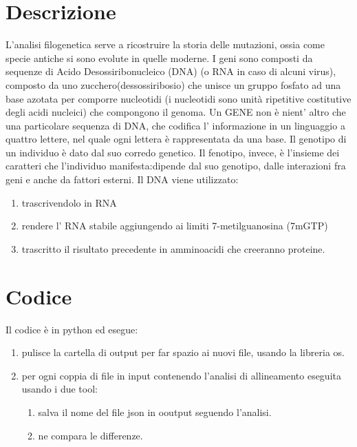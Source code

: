 \documentclass[12pt]{article}
\begin{document}
\section{Descrizione}
	
	L'analisi filogenetica serve a ricostruire la storia delle mutazioni, ossia come specie antiche si sono evolute in quelle moderne.\newline
	I geni sono composti da sequenze di Acido Desossiribonucleico (DNA) (o RNA in caso di alcuni virus), composto da uno zucchero(dessossiribosio) che unisce un gruppo fosfato ad una base azotata per comporre nucleotidi (i nucleotidi sono unità ripetitive costitutive degli acidi nucleici) che compongono il genoma.\newline
	Un GENE non è nient' altro che una particolare sequenza di DNA, che codifica l' informazione in un linguaggio a quattro lettere, nel quale ogni lettera è rappresentata da una base.\newline
	Il genotipo di un individuo è dato dal suo corredo genetico.
Il fenotipo, invece, è l'insieme dei caratteri che l'individuo manifesta:dipende dal suo genotipo, dalle interazioni fra geni e anche da fattori
esterni.\newline 
\newline Il DNA viene utilizzato: \begin{enumerate} \item trascrivendolo in RNA	
\item rendere l' RNA stabile aggiungendo ai limiti 7-metilguanosina (7mGTP)
\item trascritto il risultato precedente in amminoacidi che creeranno proteine.
	 \end{enumerate}
	
\newpage
\section{Codice}
	Il codice è in python ed esegue:
	\begin{enumerate}
		\item pulisce la cartella di output per far spazio ai nuovi file, usando la libreria os.
		\item per ogni coppia di file in input contenendo l'analisi di allineamento eseguita usando i due tool:
		\begin{enumerate}
			\item salva il nome del file json in ooutput seguendo l'analisi.
			\item ne compara le differenze.
		\end{enumerate}
	\end{enumerate}
\end{document}
